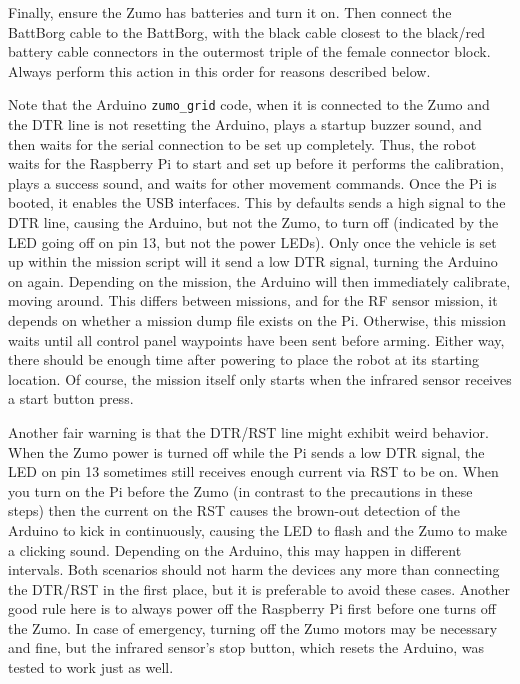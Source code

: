\documentclass{article}
\begin{document}
Finally, ensure the Zumo has batteries and turn it on. Then connect the 
BattBorg cable to the BattBorg, with the black cable closest to the black/red 
battery cable connectors in the outermost triple of the female connector block. 
Always perform this action in this order for reasons described below.

Note that the Arduino {\tt zumo\_grid} code, when it is connected to the Zumo 
and the DTR line is not resetting the Arduino, plays a startup buzzer sound, 
and then waits for the serial connection to be set up completely. Thus, the 
robot waits for the Raspberry Pi to start and set up before it performs the 
calibration, plays a success sound, and waits for other movement commands. Once 
the Pi is booted, it enables the USB interfaces. This by defaults sends a high 
signal to the DTR line, causing the Arduino, but not the Zumo, to turn off 
(indicated by the LED going off on pin 13, but not the power LEDs). Only once 
the vehicle is set up within the mission script will it send a low DTR signal, 
turning the Arduino on again. Depending on the mission, the Arduino will then 
immediately calibrate, moving around. This differs between missions, and for 
the RF sensor mission, it depends on whether a mission dump file exists on the 
Pi. Otherwise, this mission waits until all control panel waypoints have been 
sent before arming. Either way, there should be enough time after powering to 
place the robot at its starting location. Of course, the mission itself only 
starts when the infrared sensor receives a start button press.

Another fair warning is that the DTR/RST line might exhibit weird behavior. 
When the Zumo power is turned off while the Pi sends a low DTR signal, the LED 
on pin 13 sometimes still receives enough current via RST to be on. When you 
turn on the Pi before the Zumo (in contrast to the precautions in these steps) 
then the current on the RST causes the brown-out detection of the Arduino to 
kick in continuously, causing the LED to flash and the Zumo to make a clicking 
sound. Depending on the Arduino, this may happen in different intervals. Both 
scenarios should not harm the devices any more than connecting the DTR/RST in 
the first place, but it is preferable to avoid these cases. Another good rule 
here is to always power off the Raspberry Pi first before one turns off the 
Zumo. In case of emergency, turning off the Zumo motors may be necessary and 
fine, but the infrared sensor's stop button, which resets the Arduino, was 
tested to work just as well.
\end{document}
